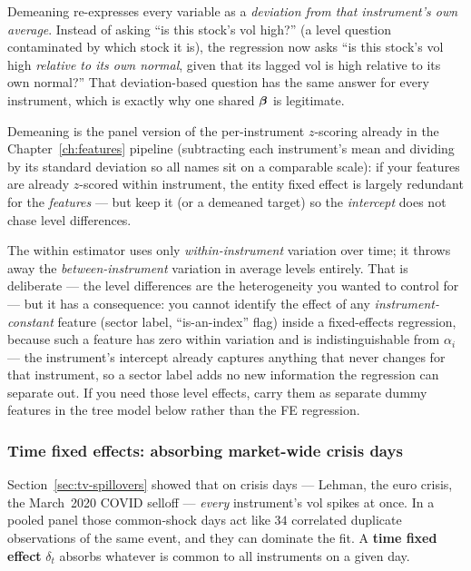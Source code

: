 \begin{intuition}
Demeaning re-expresses every variable as a \emph{deviation from that
instrument's own average}.  Instead of asking ``is this stock's vol high?'' (a
level question contaminated by which stock it is), the regression now asks ``is
this stock's vol high \emph{relative to its own normal}, given that its lagged
vol is high relative to its own normal?''  That deviation-based question has the
same answer for every instrument, which is exactly why one shared $\bm{\beta}$ is
legitimate.
\end{intuition}

\begin{projectconnection}
Demeaning is the panel version of the per-instrument $z$-scoring already in the
Chapter~\ref{ch:features} pipeline (subtracting each instrument's mean and
dividing by its standard deviation so all names sit on a comparable scale): if
your features are already $z$-scored within instrument, the entity fixed effect is
largely redundant for the \emph{features} --- but keep it (or a demeaned target)
so the \emph{intercept} does not chase level differences.
\end{projectconnection}

\begin{warning}
The within estimator uses only \emph{within-instrument} variation over time; it
throws away the \emph{between-instrument} variation in average levels entirely.
That is deliberate --- the level differences are the heterogeneity you wanted to
control for --- but it has a consequence: you cannot identify the effect of any
\emph{instrument-constant} feature (sector label, ``is-an-index'' flag) inside a
fixed-effects regression, because such a feature has zero within variation and
is indistinguishable from $\alpha_i$ --- the instrument's intercept already
captures anything that never changes for that instrument, so a sector label adds
no new information the regression can separate out.  If you need those level
effects, carry them as
separate dummy features in the tree model below rather than the FE regression.
\end{warning}

\subsubsection*{Time fixed effects: absorbing market-wide crisis days}

Section~\ref{sec:tv-spillovers} showed that on crisis days --- Lehman, the euro
crisis, the March~2020 COVID selloff --- \emph{every} instrument's vol spikes at
once.  In a pooled panel those common-shock days act like $34$ correlated
duplicate observations of the same event, and they can dominate the fit.  A
\textbf{time fixed effect} $\delta_t$ absorbs whatever is common to all
instruments on a given day.


